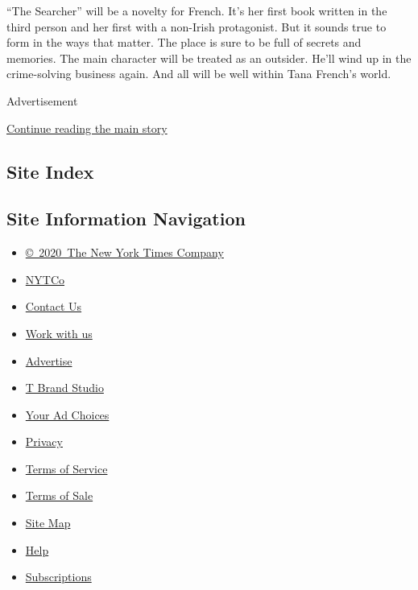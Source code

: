 ``The Searcher'' will be a novelty for French. It's her first book
written in the third person and her first with a non-Irish protagonist.
But it sounds true to form in the ways that matter. The place is sure to
be full of secrets and memories. The main character will be treated as
an outsider. He'll wind up in the crime-solving business again. And all
will be well within Tana French's world.

Advertisement

\protect\hyperlink{after-bottom}{Continue reading the main story}

\hypertarget{site-index}{%
\subsection{Site Index}\label{site-index}}

\hypertarget{site-information-navigation}{%
\subsection{Site Information
Navigation}\label{site-information-navigation}}

\begin{itemize}
\tightlist
\item
  \href{https://help.nytimes.com/hc/en-us/articles/115014792127-Copyright-notice}{©~2020~The
  New York Times Company}
\end{itemize}

\begin{itemize}
\tightlist
\item
  \href{https://www.nytco.com/}{NYTCo}
\item
  \href{https://help.nytimes.com/hc/en-us/articles/115015385887-Contact-Us}{Contact
  Us}
\item
  \href{https://www.nytco.com/careers/}{Work with us}
\item
  \href{https://nytmediakit.com/}{Advertise}
\item
  \href{http://www.tbrandstudio.com/}{T Brand Studio}
\item
  \href{https://www.nytimes.com/privacy/cookie-policy\#how-do-i-manage-trackers}{Your
  Ad Choices}
\item
  \href{https://www.nytimes.com/privacy}{Privacy}
\item
  \href{https://help.nytimes.com/hc/en-us/articles/115014893428-Terms-of-service}{Terms
  of Service}
\item
  \href{https://help.nytimes.com/hc/en-us/articles/115014893968-Terms-of-sale}{Terms
  of Sale}
\item
  \href{https://spiderbites.nytimes.com}{Site Map}
\item
  \href{https://help.nytimes.com/hc/en-us}{Help}
\item
  \href{https://www.nytimes.com/subscription?campaignId=37WXW}{Subscriptions}
\end{itemize}
